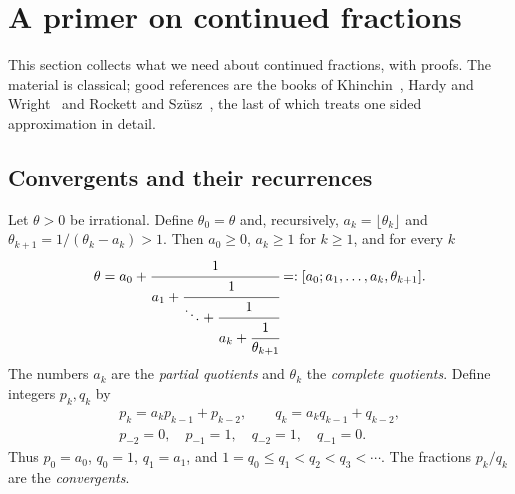 \section{A primer on continued fractions}\label{sec:ch8:cf}

This section collects what we need about continued fractions, with proofs.
The material is classical; good references are the books of
Khinchin~\cite{khinchin1964}, Hardy and Wright~\cite{hardywright2008} and
Rockett and Sz\"usz~\cite{rockett1992}, the last of which treats one sided
approximation in detail.

\subsection{Convergents and their recurrences}

Let $\theta>0$ be irrational. Define $\theta_0=\theta$ and, recursively,
$a_k=\lfloor\theta_k\rfloor$ and $\theta_{k+1}=1/(\theta_k-a_k)>1$. Then
$a_0\geq0$, $a_k\geq1$ for $k\geq1$, and for every $k$
\[
  \theta=a_0+\cfrac{1}{a_1+\cfrac{1}{\ddots+\cfrac{1}{a_k+\cfrac{1}{\theta_{k+1}}}}}
  =:[a_0;a_1,\dots,a_k,\theta_{k+1}].
\]
The numbers $a_k$ are the \emph{partial quotients} and $\theta_k$ the
\emph{complete quotients}. Define integers $p_k,q_k$ by
\begin{equation}\label{eq:ch8:recur}
  \begin{gathered}
  p_k=a_kp_{k-1}+p_{k-2},\qquad q_k=a_kq_{k-1}+q_{k-2},\\
  p_{-2}=0,\quad p_{-1}=1,\quad q_{-2}=1,\quad q_{-1}=0 .
  \end{gathered}
\end{equation}
Thus $p_0=a_0$, $q_0=1$, $q_1=a_1$, and $1=q_0\leq q_1<q_2<q_3<\cdots$. The
fractions $p_k/q_k$ are the \emph{convergents}.

